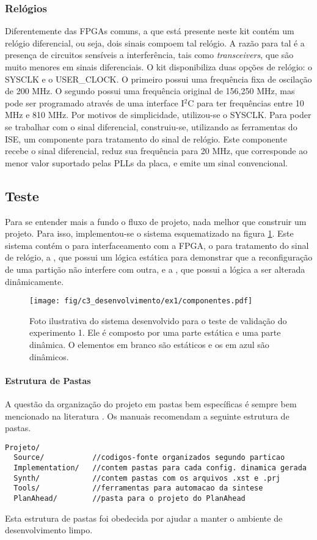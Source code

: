 \documentclass[11pt,a4paper,oneside]{book}
\begin{document}
\subsubsection{Relógios}
Diferentemente das FPGAs comuns, a que está presente neste kit contém um relógio diferencial, ou seja, dois sinais compoem tal relógio.
A razão para tal é a presença de circuitos sensíveis a interferência, tais como \textit{transceivers}, que são muito menores em sinais diferenciais.
O kit disponibiliza duas opções de relógio: o SYSCLK e o USER\_CLOCK.
O primeiro possui uma frequência fixa de oscilação de 200 MHz.
O segundo possui uma frequência original de 156,250 MHz, mas pode ser programado através de uma interface I$^2$C para ter frequências entre 10 MHz e 810 MHz.
Por motivos de simplicidade, utilizou-se o SYSCLK.
Para poder se trabalhar com o sinal diferencial, construiu-se, utilizando as ferramentas do ISE, um componente para tratamento do sinal de relógio.
Este componente recebe o sinal diferencial, reduz sua frequência para 20 MHz, que corresponde ao menor valor suportado pelas PLLs da placa, e emite um sinal convencional.

\subsection{Teste}
Para se entender mais a fundo o fluxo de projeto, nada melhor que construir um projeto.
Para isso, implementou-se o sistema esquematizado na figura \ref{fig:ex1:componentes}.
Este sistema contém o  para interfaceamento com a FPGA, o  para tratamento do sinal de relógio, a , que possui um lógica estática para demonstrar que a reconfiguração de uma partição não interfere com outra, e a , que possui a lógica a ser alterada dinâmicamente.

\begin{figure}[h]
\centering
\texttt{[image: fig/c3\_desenvolvimento/ex1/componentes.pdf]}
\caption{Foto ilustrativa do sistema desenvolvido para o teste de validação do experimento 1. Ele é composto por uma parte estática e uma parte dinâmica. O elementos em branco são estáticos e os em azul são dinâmicos.}
\label{fig:ex1:componentes}
\end{figure}

\paragraph{Estrutura de Pastas}
A questão da organização do projeto em pastas bem específicas é sempre bem mencionado na literatura \cite{ug702, ug743, ug744}.
Os manuais recomendam a seguinte estrutura de pastas.
\begin{lstlisting}
Projeto/
  Source/           //codigos-fonte organizados segundo particao
  Implementation/   //contem pastas para cada config. dinamica gerada
  Synth/            //contem pastas com os arquivos .xst e .prj
  Tools/            //ferramentas para automacao da sintese
  PlanAhead/        //pasta para o projeto do PlanAhead
\end{lstlisting}
Esta estrutura de pastas foi obedecida por ajudar a manter o ambiente de desenvolvimento limpo.
\end{document}
